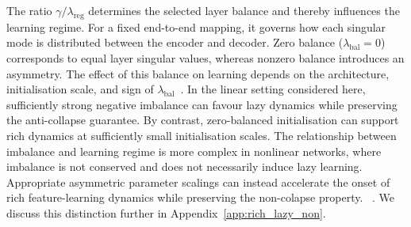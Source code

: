 \documentclass{article} %
\newcommand{\wa}{\mathbf{W}_1}
\newcommand{\wb}{\mathbf{W}_2}
\newtheorem{proposition}[theorem]{Proposition}
\theoremstyle{remark}
\begin{document}
The ratio $\gamma/\lambda_{\mathrm{reg}}$ determines the selected layer balance and thereby influences the learning regime. For a fixed end-to-end mapping, it governs how each singular mode is distributed between the encoder and decoder. Zero balance ($\lambda_{\mathrm{bal}}=0$) corresponds to equal layer singular values, whereas nonzero balance introduces an asymmetry. The effect of this balance on learning depends on the architecture, initialisation scale, and sign of $\lambda_{\mathrm{bal}}$~\citep{dominé2024lazyrichexactlearning}. In the linear setting considered here, sufficiently strong negative imbalance can favour lazy dynamics while preserving the anti-collapse guarantee. By contrast, zero-balanced initialisation can support rich dynamics at sufficiently small initialisation scales. The relationship between imbalance and learning regime is more complex in nonlinear networks, where imbalance is not conserved and does not necessarily induce lazy learning. Appropriate asymmetric parameter scalings can instead accelerate the onset of rich feature-learning dynamics while preserving the non-colapse property. ~\citep{anguita2026theory,kumar2023grokking,kunin_2024_get}. We discuss this distinction further in Appendix~\ref{app:rich_lazy_non}.



\label{eq:encoder-bi-explicit}
\end{document}
